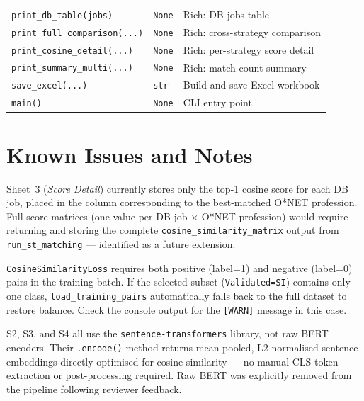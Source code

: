 ﻿\documentclass[12pt,a4paper]{article}
\begin{document}
\begin{longtable}{@{}P{6.5cm}P{3cm}P{5.5cm}@{}}
\texttt{print\_db\_table(jobs)} & \texttt{None} & Rich: DB jobs table \\
\texttt{print\_full\_comparison(...)} & \texttt{None} & Rich: cross-strategy comparison \\
\texttt{print\_cosine\_detail(...)} & \texttt{None} & Rich: per-strategy score detail \\
\texttt{print\_summary\_multi(...)} & \texttt{None} & Rich: match count summary \\
\texttt{save\_excel(...)} & \texttt{str} & Build and save Excel workbook \\
\texttt{main()} & \texttt{None} & CLI entry point \\
\bottomrule
\end{longtable}

\clearpage
\section{Known Issues and Notes}

\begin{tcolorbox}[colback=noteblue!40, colframe=blue!60!black,
                  title=Note: Score Detail sheet is sparse]
Sheet~3 (\textit{Score Detail}) currently stores only the top-1 cosine score for each DB job, placed in the column corresponding to the best-matched O*NET profession. Full score matrices (one value per DB job $\times$ O*NET profession) would require returning and storing the complete \texttt{cosine\_similarity\_matrix} output from \texttt{run\_st\_matching} --- identified as a future extension.
\end{tcolorbox}

\vspace{0.6em}

\begin{tcolorbox}[colback=warnred!40, colframe=red!60!black,
                  title=Warning: S3 fine-tuning requires balanced training data]
\texttt{CosineSimilarityLoss} requires both positive (label=1) and negative (label=0) pairs in the training batch. If the selected subset (\texttt{Validated=SI}) contains only one class, \texttt{load\_training\_pairs} automatically falls back to the full dataset to restore balance. Check the console output for the \texttt{[WARN]} message in this case.
\end{tcolorbox}

\vspace{0.6em}

\begin{tcolorbox}[colback=importantbg!60, colframe=green!50!black,
                  title=Important: All NLP models are native sentence-transformers]
S2, S3, and S4 all use the \texttt{sentence-transformers} library, not raw BERT encoders. Their \texttt{.encode()} method returns mean-pooled, L2-normalised sentence embeddings directly optimised for cosine similarity --- no manual CLS-token extraction or post-processing required. Raw BERT was explicitly removed from the pipeline following reviewer feedback.
\end{tcolorbox}
\end{document}
